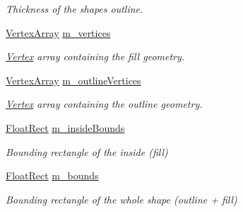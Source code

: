 \begin{DoxyCompactItemize}
\begin{DoxyCompactList}\small\item\em Thickness of the shape\textquotesingle{}s outline. \end{DoxyCompactList}\item 
\mbox{\label{classsf_1_1_shape_a51ef27e5e9dc2419354fd036cf581201}} 
\mbox{\hyperlink{classsf_1_1_vertex_array}{Vertex\+Array}} \mbox{\hyperlink{classsf_1_1_shape_a51ef27e5e9dc2419354fd036cf581201}{m\+\_\+vertices}}
\begin{DoxyCompactList}\small\item\em \mbox{\hyperlink{classsf_1_1_vertex}{Vertex}} array containing the fill geometry. \end{DoxyCompactList}\item 
\mbox{\label{classsf_1_1_shape_a822af4e3f583a069e2de6482edfacd4a}} 
\mbox{\hyperlink{classsf_1_1_vertex_array}{Vertex\+Array}} \mbox{\hyperlink{classsf_1_1_shape_a822af4e3f583a069e2de6482edfacd4a}{m\+\_\+outline\+Vertices}}
\begin{DoxyCompactList}\small\item\em \mbox{\hyperlink{classsf_1_1_vertex}{Vertex}} array containing the outline geometry. \end{DoxyCompactList}\item 
\mbox{\label{classsf_1_1_shape_a4bf719be26d465b86024232097d34494}} 
\mbox{\hyperlink{classsf_1_1_rect}{Float\+Rect}} \mbox{\hyperlink{classsf_1_1_shape_a4bf719be26d465b86024232097d34494}{m\+\_\+inside\+Bounds}}
\begin{DoxyCompactList}\small\item\em Bounding rectangle of the inside (fill) \end{DoxyCompactList}\item 
\mbox{\label{classsf_1_1_shape_ad1d06d0e65b363f6b62f6794454a1d2b}} 
\mbox{\hyperlink{classsf_1_1_rect}{Float\+Rect}} \mbox{\hyperlink{classsf_1_1_shape_ad1d06d0e65b363f6b62f6794454a1d2b}{m\+\_\+bounds}}
\begin{DoxyCompactList}\small\item\em Bounding rectangle of the whole shape (outline + fill) \end{DoxyCompactList}\end{DoxyCompactItemize}


